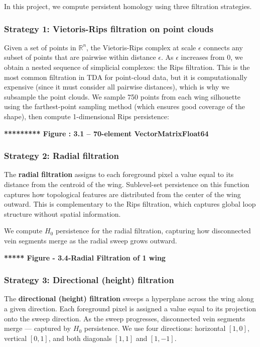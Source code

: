 \documentclass{birkjour}
\theoremstyle{definition}
\theoremstyle{remark}
\numberwithin{equation}{section}
\begin{document}
In this project, we compute persistent homology using three filtration strategies. 


\subsubsection{Strategy 1: Vietoris-Rips filtration on point clouds}
\quad

Given a set of points in \(\mathbb{R}^{n}\), the Vietoris-Rips complex at scale \(\epsilon\) connects any subset of points that are pairwise within distance \(\epsilon\). 
As \(\epsilon\) increases from \(0\), we obtain a nested sequence of simplicial complexes: the Rips filtration. 
This is the most common filtration in TDA for point-cloud data, but it is computationally expensive (since it must consider all pairwise distances), which is why we subsample the point clouds.
We sample 750 points from each wing silhouette using the farthest-point sampling method (which ensures good coverage of the shape), then compute 1-dimensional Rips persistence:

\textbf{********* Figure : 3.1 -- 70-element Vector{Matrix{Float64}}}


\subsubsection{Strategy 2: Radial filtration}\quad


The \textbf{radial filtration} assigns to each foreground pixel a value equal to its distance from the centroid of the wing. 
Sublevel-set persistence on this function captures how topological features are distributed from the center of the wing outward. 
This is complementary to the Rips filtration, which captures global loop structure without spatial information.

We compute \(H_0\) persistence for the radial filtration, capturing how disconnected vein segments merge as the radial sweep grows outward.



\textbf{***** Figure - 3.4-Radial Filtration of 1 wing}


\subsubsection{Strategy 3: Directional (height) filtration}
\quad

 
The \textbf{directional (height) filtration} sweeps a hyperplane across the wing along a given direction. 
Each foreground pixel is assigned a value equal to its projection onto the sweep direction. 
As the sweep progresses, disconnected vein segments merge — captured by \(H_0\) persistence. 
We use four directions: horizontal \([1,0]\), vertical \([0,1]\), and both diagonals \([1,1]\) and \([1,-1]\).
 
\end{document}
